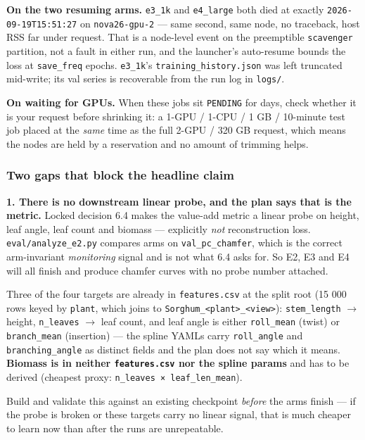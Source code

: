 \documentclass[
  10pt,
]{article}
\begin{document}
\textbf{On the two resuming arms.} \texttt{e3\_1k} and
\texttt{e4\_large} both died at exactly \texttt{2026-09-19T15:51:27} on
\texttt{nova26-gpu-2} --- same second, same node, no traceback, host RSS
far under request. That is a node-level event on the preemptible
\texttt{scavenger} partition, not a fault in either run, and the
launcher's auto-resume bounds the loss at \texttt{save\_freq} epochs.
\texttt{e3\_1k}'s \texttt{training\_history.json} was left truncated
mid-write; its val series is recoverable from the run log in
\texttt{logs/}.

\textbf{On waiting for GPUs.} When these jobs sit \texttt{PENDING} for
days, check whether it is your request before shrinking it: a 1-GPU /
1-CPU / 1 GB / 10-minute test job placed at the \emph{same} time as the
full 2-GPU / 320 GB request, which means the nodes are held by a
reservation and no amount of trimming helps.

\subsubsection{Two gaps that block the headline
claim}\label{two-gaps-that-block-the-headline-claim}

\textbf{1. There is no downstream linear probe, and the plan says that
is the metric.} Locked decision 6.4 makes the value-add metric a linear
probe on height, leaf angle, leaf count and biomass --- explicitly
\emph{not} reconstruction loss. \texttt{eval/analyze\_e2.py} compares
arms on \texttt{val\_pc\_chamfer}, which is the correct arm-invariant
\emph{monitoring} signal and is not what 6.4 asks for. So E2, E3 and E4
will all finish and produce chamfer curves with no probe number
attached.

Three of the four targets are already in \texttt{features.csv} at the
split root (15 000 rows keyed by \texttt{plant}, which joins to
\texttt{Sorghum\_\textless{}plant\textgreater{}\_\textless{}view\textgreater{}}):
\texttt{stem\_length} \(\to\) height, \texttt{n\_leaves} \(\to\) leaf
count, and leaf angle is either \texttt{roll\_mean} (twist) or
\texttt{branch\_mean} (insertion) --- the spline YAMLs carry
\texttt{roll\_angle} and \texttt{branching\_angle} as distinct fields
and the plan does not say which it means. \textbf{Biomass is in neither
\texttt{features.csv} nor the spline params} and has to be derived
(cheapest proxy: \texttt{n\_leaves\ ×\ leaf\_len\_mean}).

Build and validate this against an existing checkpoint \emph{before} the
arms finish --- if the probe is broken or these targets carry no linear
signal, that is much cheaper to learn now than after the runs are
unrepeatable.
\end{document}
